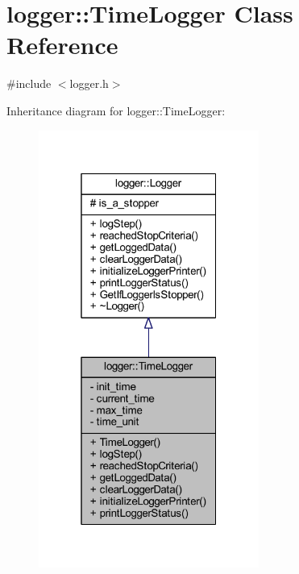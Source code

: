 \hypertarget{classlogger_1_1_time_logger}{}\section{logger\+:\+:Time\+Logger Class Reference}
\label{classlogger_1_1_time_logger}


{\ttfamily \#include $<$logger.\+h$>$}



Inheritance diagram for logger\+:\+:Time\+Logger\+:\nopagebreak
\begin{figure}[H]
\begin{center}
\leavevmode
\includegraphics[width=205pt]{classlogger_1_1_time_logger__inherit__graph}
\end{center}
\end{figure}


